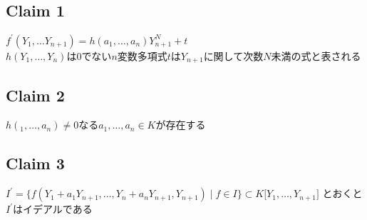 \documentclass[12pt,a4paper]{article}
\begin{document}
\subsection*{Claim 1}
  $f^\prime (Y_1, \ldots Y_{n+1}) = h(a_1, \ldots, a_n)Y_{n+1}^N + t$ \\
  $h(Y_1, \ldots, Y_n) $は$0$でない$n$変数多項式$t$は$Y_{n+1}$に関して次数$N$未満の式と表される
\subsection*{Claim 2}
  $h(_1, \ldots, a_n) \neq 0 $なる$a_1, \ldots, a_n \in K$が存在する
\subsection*{Claim 3}
  $I^\prime = \lbrace f( Y_1 + a_1 Y_{n+1}, \ldots , Y_n + a_n Y_{n+1}, Y_{n+1}) \mid f \in I \rbrace \subset K \lbrack Y_1, \ldots, Y_{n+1} \rbrack$
  とおくと$I^\prime$はイデアルである \\
\end{document}
